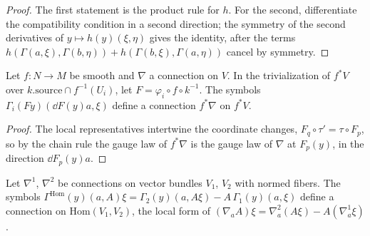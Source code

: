 \begin{proof}
  \leanok
  The first statement is the product rule for $h$. For the second, differentiate the
  compatibility condition in a second direction; the symmetry of the second derivatives of
  $y \mapsto h(y)(\xi, \eta)$ gives the identity, after the terms
  $h(\Gamma(a, \xi), \Gamma(b, \eta)) + h(\Gamma(b, \xi), \Gamma(a, \eta))$ cancel by symmetry.
\end{proof}

\begin{theorem}
  \label{thm:pullback-connection}
  \leanok
  Let $f \colon N \to M$ be smooth and $\nabla$ a connection on $V$. In the trivialization of
  $f^*V$ over $k.\mathrm{source} \cap f^{-1}(U_i)$, let $F = \varphi_i \circ f \circ k^{-1}$. The
  symbols $\Gamma_i(F y)(\dd F(y) a, \xi)$ define a connection $f^*\nabla$ on $f^*V$.
\end{theorem}

\begin{proof}
  \leanok
  The local representatives intertwine the coordinate changes, $F_q \circ \tau' = \tau \circ F_p$,
  so by the chain rule the gauge law of $f^*\nabla$ is the gauge law of $\nabla$ at $F_p(y)$, in
  the direction $\dd F_p(y) a$.
\end{proof}

\begin{theorem}
  \label{thm:hom-connection}
  \leanok
  Let $\nabla^1$, $\nabla^2$ be connections on vector bundles $V_1$, $V_2$ with normed fibers.
  The symbols $\Gamma^{\mathrm{Hom}}(y)(a, A)\xi = \Gamma_2(y)(a, A\xi) - A\,\Gamma_1(y)(a, \xi)$
  define a connection on $\mathrm{Hom}(V_1, V_2)$, the local form of
  $(\nabla_a A)\xi = \nabla^2_a(A\xi) - A(\nabla^1_a \xi)$.
\end{theorem}

